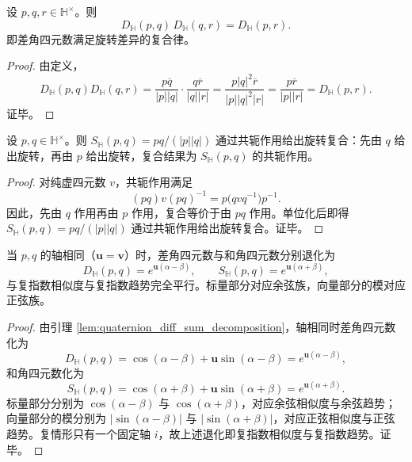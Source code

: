 \begin{proposition}[差角四元数的复合律]\label{prop:quaternion_exp_similarity_composition}
设 $p,q,r\in\mathbb H^\times$。则
\[
D_{\mathbb H}(p,q)\,D_{\mathbb H}(q,r)
=
D_{\mathbb H}(p,r).
\]
即差角四元数满足旋转差异的复合律。
\end{proposition}

\begin{proof}
由定义，
\[
D_{\mathbb H}(p,q)D_{\mathbb H}(q,r)
=
\frac{p\overline q}{|p||q|}\cdot\frac{q\overline r}{|q||r|}
=
\frac{p|q|^2\overline r}{|p||q|^2|r|}
=
\frac{p\overline r}{|p||r|}
=
D_{\mathbb H}(p,r).
\]
证毕。
\end{proof}

\begin{theorem}[和角四元数是三维旋转复合算子]\label{thm:quaternion_sum_rotation_operator}
设 $p,q\in\mathbb H^\times$。则 $S_{\mathbb H}(p,q)=pq/(|p||q|)$ 通过共轭作用给出旋转复合：先由 $q$ 给出旋转，再由 $p$ 给出旋转，复合结果为 $S_{\mathbb H}(p,q)$ 的共轭作用。
\end{theorem}

\begin{proof}
对纯虚四元数 $v$，共轭作用满足
\[
(pq)v(pq)^{-1}=p\bigl(qvq^{-1}\bigr)p^{-1}.
\]
因此，先由 $q$ 作用再由 $p$ 作用，复合等价于由 $pq$ 作用。单位化后即得 $S_{\mathbb H}(p,q)=pq/(|p||q|)$ 通过共轭作用给出旋转复合。证毕。
\end{proof}

\begin{theorem}[和角四元数的轴相同时退化与复数情形平行]\label{thm:quaternion_sum_rotation_degeneration}
当 $p,q$ 的轴相同（$\mathbf u=\mathbf v$）时，差角四元数与和角四元数分别退化为
\[
D_{\mathbb H}(p,q)=e^{\mathbf u(\alpha-\beta)},\qquad
S_{\mathbb H}(p,q)=e^{\mathbf u(\alpha+\beta)},
\]
与复指数相似度与复指数趋势完全平行。标量部分对应余弦族，向量部分的模对应正弦族。
\end{theorem}

\begin{proof}
由引理 \ref{lem:quaternion_diff_sum_decomposition}，轴相同时差角四元数化为
\[
D_{\mathbb H}(p,q)=\cos(\alpha-\beta)+\mathbf u\sin(\alpha-\beta)=e^{\mathbf u(\alpha-\beta)},
\]
和角四元数化为
\[
S_{\mathbb H}(p,q)=\cos(\alpha+\beta)+\mathbf u\sin(\alpha+\beta)=e^{\mathbf u(\alpha+\beta)}.
\]
标量部分分别为 $\cos(\alpha-\beta)$ 与 $\cos(\alpha+\beta)$，对应余弦相似度与余弦趋势；向量部分的模分别为 $|\sin(\alpha-\beta)|$ 与 $|\sin(\alpha+\beta)|$，对应正弦相似度与正弦趋势。复情形只有一个固定轴 $i$，故上述退化即复指数相似度与复指数趋势。证毕。
\end{proof}

